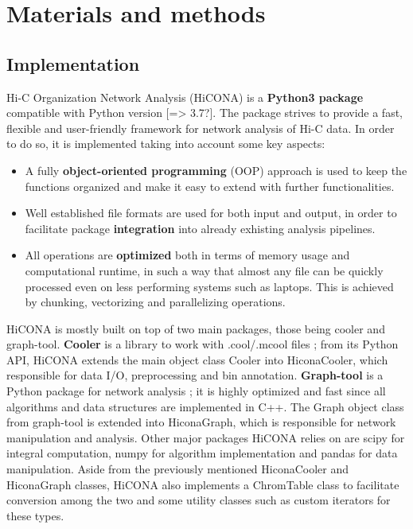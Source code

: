\graphicspath{{chapters/04_materials_and_methods/images/}}
\chapter{Materials and methods}



\section{Implementation}
Hi-C Organization Network Analysis (HiCONA) is a \textbf{Python3 package} compatible with Python version [=> 3.7?]. The package strives to provide a fast, flexible and user-friendly framework for network analysis of Hi-C data. In order to do so, it is implemented taking into account some key aspects:
\begin{itemize}\tightlist
  \item A fully \textbf{object-oriented programming} (OOP) approach is used to keep the functions organized and make it easy to extend with further functionalities.
  \item Well established file formats are used for both input and output, in order to facilitate package \textbf{integration} into already exhisting analysis pipelines.
  \item All operations are \textbf{optimized} both in terms of memory usage and computational runtime, in such a way that almost any file can be quickly processed even on less performing systems such as laptops. This is achieved by chunking, vectorizing and parallelizing operations.
\end{itemize}

HiCONA is mostly built on top of two main packages, those being cooler and graph-tool. \textbf{Cooler} is a library to work with .cool/.mcool files \cite{cooler2020}; from its Python API, HiCONA extends the main object class Cooler into HiconaCooler, which responsible for data I/O, preprocessing and bin annotation. \textbf{Graph-tool} is a Python package for network analysis \cite{graphtool2014}; it is highly optimized and fast since all algorithms and data structures are implemented in C++. The Graph object class from graph-tool is extended into HiconaGraph, which is responsible for network manipulation and analysis. Other major packages HiCONA relies on are scipy \cite{scipy2020} for integral computation, numpy \cite{numpy2020} for algorithm implementation and pandas \cite{pandas2020} for data manipulation. Aside from the previously mentioned HiconaCooler and HiconaGraph classes, HiCONA also implements a ChromTable class to facilitate conversion among the two and some utility classes such as custom iterators for these types.

